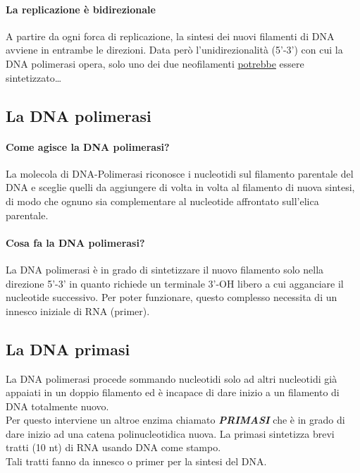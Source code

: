 \documentclass{article}
\begin{document}
\paragraph{La replicazione è bidirezionale} A partire da ogni forca di replicazione, la sintesi dei nuovi filamenti di DNA avviene in entrambe le direzioni. Data però l'unidirezionalità (5'-3') con cui la DNA polimerasi opera, solo uno dei due neofilamenti \underline{potrebbe} essere sintetizzato\dots
\subsection{La DNA polimerasi}
\paragraph{Come agisce la DNA polimerasi?} La molecola di DNA-Polimerasi riconosce i nucleotidi sul filamento parentale del DNA e sceglie quelli da aggiungere di volta in volta al filamento di nuova sintesi, di modo che ognuno sia complementare al nucleotide affrontato sull'elica parentale.
\paragraph{Cosa fa la DNA polimerasi?} La DNA polimerasi è in grado di sintetizzare il nuovo filamento solo nella direzione 5'-3' in quanto richiede un terminale 3'-OH libero a cui agganciare il nucleotide successivo. Per poter funzionare, questo complesso necessita di un innesco iniziale di RNA (primer).
\subsection{La DNA primasi} La DNA polimerasi procede sommando nucleotidi solo ad altri nucleotidi già appaiati in un doppio filamento ed è incapace di dare inizio a un filamento di DNA totalmente nuovo.\\ Per questo interviene un altroe enzima chiamato \textit{\textbf{PRIMASI}} che è in grado di dare inizio ad una catena polinucleotidica nuova. La primasi sintetizza brevi tratti (10 nt) di RNA usando DNA come stampo.\\ Tali tratti fanno da innesco o primer per la sintesi del DNA.
\end{document}
